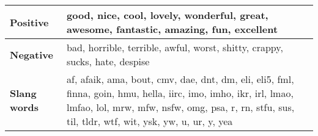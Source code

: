 \begin{tabular}{|l|l|} \hline
\textbf{Positive} & good, nice, cool, lovely, wonderful, great, awesome, fantastic, amazing, fun, excellent \\ \hline
\textbf{Negative} & bad, horrible, terrible, awful, worst, shitty, crappy, sucks, hate, despise \\ \hline
\textbf{Slang words} & af, afaik, ama, bout, cmv, dae, dnt, dm, eli, eli5, fml, finna, goin, hmu, hella, iirc, imo, imho, ikr, irl, lmao, lmfao, lol, mrw, mfw, nsfw, omg, psa, r, rn, stfu, sus, til, tldr, wtf, wit, ysk, yw, u, ur, y, yea \\ \hline
\end{tabular}